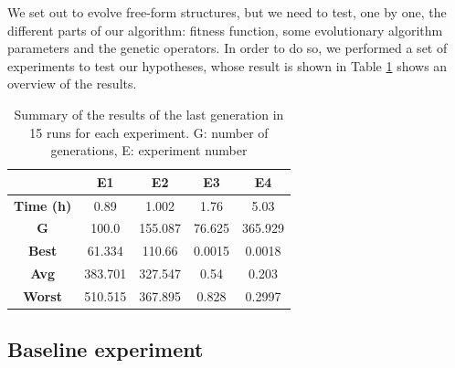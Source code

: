 \documentclass[sigconf]{acmart}
\newcommand{\myfloatalign}{\centering} %
\begin{document}
We set out to evolve free-form structures, but we need to test, one by
one, the different parts of our algorithm: fitness function, some
evolutionary algorithm parameters and the genetic operators. In order
to do so, we performed a set of experiments to test our hypotheses,
whose result is shown in Table \ref{t:resOver} shows an overview of the results. 
\begin{table}[H]
	\myfloatalign
	\caption{Summary of the results of the last generation in 15 runs for each
          experiment.
          G: number of generations, E: experiment 
	number} %
	\label{t:resOver}
	\begin{tabular}{ccccc}
		& \textbf{E1} & \textbf{E2} & \textbf{E3} &\textbf{E4} \\ \hline
		\textbf{Time (h)} & 0.89 & 1.002 & 1.76 & 5.03 \\  \hline
		\textbf{G} &  100.0 & 155.087 & 76.625 & 365.929 \\  \hline
		\textbf{Best} & 61.334 & 110.66 & 0.0015 & 0.0018 \\  \hline
		\textbf{Avg} & 383.701 & 327.547 & 0.54 &  0.203 \\  \hline
		\textbf{Worst}  & 510.515 & 367.895 & 0.828 & 0.2997\\  \hline
		\hline
	\end{tabular}
\end{table}

\subsection{Baseline experiment}
\end{document}
